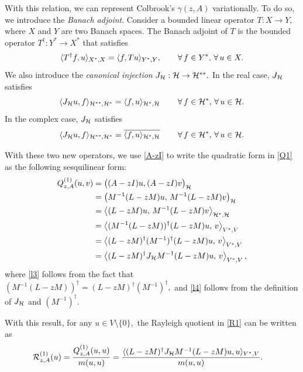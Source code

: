 With this relation, we can represent Colbrook's $\gamma(z, A)$ variationally. To do so, we introduce the \textit{Banach adjoint}. Consider a bounded linear operator $T: X \rightarrow Y,$ where $X$ and $Y$ are two Banach spaces. The Banach adjoint of $T$ is the bounded operator $T^{\dagger}:Y^* \rightarrow X^*$ that satisfies
\begin{equation}
    \langle T^{\dagger}f, u \rangle_{X^*, X} = \langle f, Tu \rangle_{Y^*, Y}, \qquad \operatorname{\forall} f \in Y^*, \, \operatorname{\forall} u \in X.
\end{equation}
We also introduce the \textit{canonical injection} $J_{\mathcal{H}} : \mathcal{H} \rightarrow \mathcal{H}^{**}.$ In the real case, $J_{\mathcal{H}}$ satisfies 
\begin{equation}
   \langle J_{\mathcal{H}} u, f \rangle_{\mathcal{H}^{**}, \mathcal{H}^*} = \langle f, u \rangle_{\mathcal{H}^*, \mathcal{H}} \qquad \operatorname{\forall} f \in \mathcal{H}^*, \, \operatorname{\forall} u \in \mathcal{H}. 
\end{equation}
In the complex case, $J_{\mathcal{H}}$ satisfies
\begin{equation}
   \langle J_{\mathcal{H}} u, f \rangle_{\mathcal{H}^{**}, \mathcal{H}^*} = \overline{\langle f, u \rangle_{\mathcal{H}^*, \mathcal{H}}} \qquad \operatorname{\forall} f \in \mathcal{H}^*, \, \operatorname{\forall} u \in \mathcal{H}. 
\end{equation}


With these two new operators, we use \eqref{A-zI} to write the quadratic form in \eqref{Q1} as the following sesquilinear form:
\begin{align}
    Q_{z,A}^{(1)}(u,v)
    &= \bigl((A-zI)u,(A-zI)v \bigr)_{\mathcal{H}} \\
    &= \bigl(M^{-1}(L-zM)u,\,
             M^{-1}(L-zM)v\bigr)_{\mathcal{H}} \\
    &= \left\langle
        (L-zM)u,\,
        M^{-1}(L-zM)v
    \right\rangle_{\mathcal{H}^*,\mathcal{H}} \\
    &= \left\langle
        (M^{-1}(L-zM))^{\dagger}(L-zM)u,\,
        v
    \right\rangle_{V^*,V} \\
    &= \left\langle
        (L-zM)^{\dagger}(M^{-1})^{\dagger}(L-zM)u,\,
        v
    \right\rangle_{V^*,V}  \label{l3}\\
    &= \left\langle
        (L-zM)^{\dagger}J_{\mathcal{H}} M^{-1}(L-zM)u,\,
        v
    \right\rangle_{V^*,V}, \label{l4}
\end{align}
where \eqref{l3} follows from the fact that $(M^{-1}(L-zM))^{\dagger} = (L-zM)^{\dagger}(M^{-1})^{\dagger},$ and \eqref{l4} follows from the 
definition of $J_{\mathcal{H}}$ and $(M^{-1})^{\dagger}.$

With this result, for any $u \in V \setminus\{0\},$ the Rayleigh quotient in \eqref{R1} can be written as
\begin{align} \label{R1 var}
    \mathcal{R}_{z, A}^{(1)}(u) 
    &= \frac{Q_{z, A}^{(1)}(u, u)}{m(u, u)} 
    = \frac{\langle (L-zM)^{\dagger}J_{\mathcal{H}} M^{-1} (L-zM)u, u \rangle_{V^*, V} }{m(u, u)}.
\end{align}

